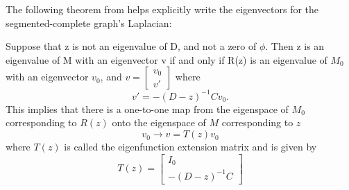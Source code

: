 The following theorem from \cite{VibrationModes} helps explicitly write the eigenvectors for the segmented-complete graph's Laplacian:
\begin{theorem}
Suppose that z is not an eigenvalue of D, and not a zero of $\phi$.
Then z is an eigenvalue of M with an eigenvector v if and only if R(z) is an eigenvalue of $M_0$ with an eigenvector $v_0$, and $v = \begin{bmatrix} v_0\\ v'\end{bmatrix}$ where 
$$
v' = -(D - z)^{-1}Cv_0.
$$
This implies that there is a one-to-one map from the eigenspace of $M_0$ corresponding to $R(z)$ onto the eigenspace of $M$ corresponding to $z$
$$
v_0 \rightarrow v = T(z)v_0
$$
where $T(z)$ is called the eigenfunction extension matrix and is given by
$$
T(z) = \begin{bmatrix}
    I_0\\
    -(D - z)^{-1}C
\end{bmatrix}
$$
\end{theorem}

